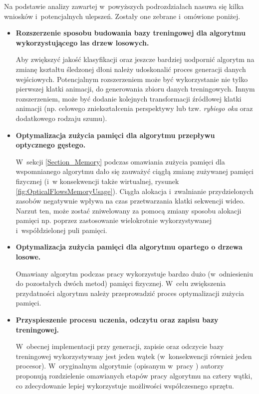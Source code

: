     Na podstawie analizy zawartej w~powyższych podrozdziałach nasuwa się kilka wniosków i~potencjalnych ulepszeń. Zostały one zebrane i~omówione poniżej.

    \begin{itemize}
      \item \textbf{Rozszerzenie sposobu budowania bazy treningowej dla algorytmu wykorzystującego las drzew losowych.}

      Aby zwiększyć jakość klasyfikacji oraz jeszcze bardziej uodpornić algorytm na zmianę kształtu śledzonej dłoni należy udoskonalić proces generacji danych wejściowych. Potencjalnym rozszerzeniem może być wykorzystanie nie tylko pierwszej klatki animacji, do generowania zbioru danych treningowych. Innym rozszerzeniem, może być dodanie kolejnych transformacji źródłowej klatki animacji (np. celowego zniekształcenia perspektywy lub tzw. \textit{rybiego oka} oraz dodatkowego rodzaju szumu).

      \item \textbf{Optymalizacja zużycia pamięci dla algorytmu przepływu optycznego gęstego.}

      W~sekcji \ref{Section_Memory} podczas omawiania zużycia pamięci dla wspomnianego algorytmu dało się zauważyć ciągłą zmianę zużywanej pamięci fizycznej (i~w konsekwencji także wirtualnej, rysunek \ref{fig:OpticalFlowsMemoryUsage}). Ciągła alokacja i~zwalnianie przydzielonych zasobów negatywnie wpływa na czas przetwarzania klatki sekwencji wideo. Narzut ten, może zostać zniwelowany za pomocą zmiany sposobu alokacji pamięci np. poprzez zastosowanie wielokrotnie wykorzystywanej i~współdzielonej puli pamięci.

      \item \textbf{Optymalizacja zużycia pamięci dla algorytmu opartego o drzewa losowe.}

      Omawiany algorytm podczas pracy wykorzystuje bardzo dużo (w~odniesieniu do pozostałych dwóch metod) pamięci fizycznej. W~celu zwiększenia przydatności algorytmu należy przeprowadzić proces optymalizacji zużycia pamięci.

      \item \textbf{Przyspieszenie procesu uczenia, odczytu oraz zapisu bazy treningowej.}

       W~obecnej implementacji przy generacji, zapisie oraz odczycie bazy treningowej wykorzystywany jest jeden wątek (w~konsekwencji również jeden procesor). W~oryginalnym algorytmie (opisanym w~pracy \cite{RandomizedTrees06}) autorzy proponują rozdzielenie omawianych etapów pracy algorytmu na cztery wątki, co zdecydowanie lepiej wykorzystuje możliwości współczesnego sprzętu.
    \end{itemize}

